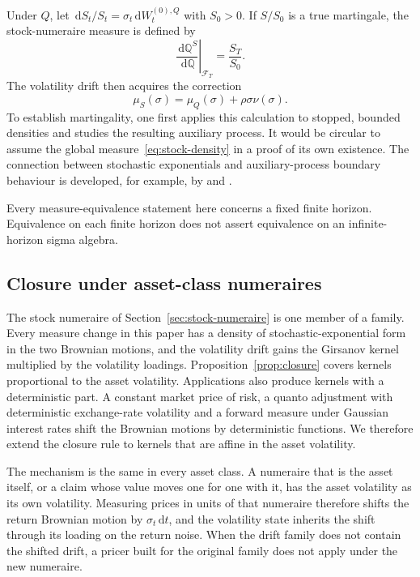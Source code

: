 \documentclass[11pt,a4paper]{article}
\theoremstyle{definition}
\theoremstyle{remark}
\newcommand{\QQ}{\mathbb{Q}}
\newcommand{\QS}{\mathbb{Q}^{S}}
\newcommand{\dd}{\,\mathrm{d}}
\begin{document}
Under \(Q\), let \(\dd S_t/S_t=\sigma_t\dd W_t^{(0),Q}\) with \(S_0>0\). If \(S/S_0\) is a true martingale, the stock-numeraire measure is defined by
\begin{equation}
 \left.\frac{\dd\QS}{\dd\QQ}\right|_{\mathcal F_T}=\frac{S_T}{S_0}.
 \label{eq:stock-density}
\end{equation}
The volatility drift then acquires the correction
\begin{equation}
 \mu_S(\sigma)=\mu_Q(\sigma)+\rho\sigma\nu(\sigma).
 \label{eq:stock-correction}
\end{equation}
To establish martingality, one first applies this calculation to stopped, bounded densities and studies the resulting auxiliary process. It would be circular to assume the global measure~\eqref{eq:stock-density} in a proof of its own existence. The connection between stochastic exponentials and auxiliary-process boundary behaviour is developed, for example, by \citet{Sin1998} and \citet{MijatovicUrusov2012}.

Every measure-equivalence statement here concerns a fixed finite horizon. Equivalence on each finite horizon does not assert equivalence on an infinite-horizon sigma algebra.

\subsection{Closure under asset-class numeraires}
\label{sec:numeraires}

The stock numeraire of Section~\ref{sec:stock-numeraire} is one member of a family. Every measure change in this paper has a density of stochastic-exponential form in the two Brownian motions, and the volatility drift gains the Girsanov kernel multiplied by the volatility loadings. Proposition~\ref{prop:closure} covers kernels proportional to the asset volatility. Applications also produce kernels with a deterministic part. A constant market price of risk, a quanto adjustment with deterministic exchange-rate volatility and a forward measure under Gaussian interest rates shift the Brownian motions by deterministic functions. We therefore extend the closure rule to kernels that are affine in the asset volatility.

The mechanism is the same in every asset class. A numeraire that is the asset itself, or a claim whose value moves one for one with it, has the asset volatility as its own volatility. Measuring prices in units of that numeraire therefore shifts the return Brownian motion by \(\sigma_t\dd t\), and the volatility state inherits the shift through its loading on the return noise. When the drift family does not contain the shifted drift, a pricer built for the original family does not apply under the new numeraire.
\end{document}
